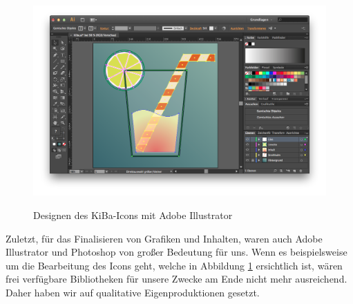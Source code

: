 \begin{figure}[hb]
	\centering
	\includegraphics[scale=.3]{Pictures/IllustratorIcon}
	\label{fig:IllustratorIcon}
	\caption{Designen des KiBa-Icons mit Adobe Illustrator}
\end{figure}

	Zuletzt, für das Finalisieren von Grafiken und Inhalten, waren auch Adobe Illustrator und Photoshop von großer Bedeutung für uns. Wenn es beispielsweise um die Bearbeitung des Icons geht, welche in Abbildung \ref{fig:IllustratorIcon} ersichtlich ist, wären frei verfügbare Bibliotheken für unsere Zwecke am Ende nicht mehr ausreichend. Daher haben wir auf qualitative Eigenproduktionen gesetzt.
